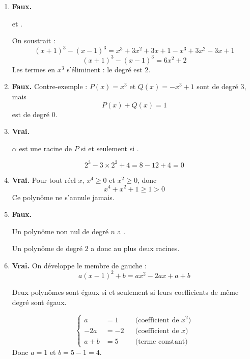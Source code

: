 \begin{enumerate}[itemsep=14pt]
  \item \textbf{Faux.}
  \begin{prop}
   \quad et \quad {}.
  \end{prop}
  On soustrait :
  \[(x+1)^3-(x-1)^3=x^3+3x^2+3x+1-x^3+3x^2-3x+1\]
  \[(x+1)^3-(x-1)^3=6x^2+2\]
  Les termes en $x^3$ s'éliminent : le degré est $2$.

  \item \textbf{Faux.} Contre-exemple : $P(x)=x^3$ et $Q(x)=-x^3+1$ sont de degré $3$, mais
  \[P(x)+Q(x)=1\]
  est de degré $0$.

  \item \textbf{Vrai.}
  \begin{prop}[Racine]
  $\alpha$ est une racine de $P$ si et seulement si .
  \end{prop}
  \[2^3-3\times2^2+4=8-12+4=0\]

  \item \textbf{Vrai.} Pour tout réel $x$, $x^4\geq0$ et $x^2\geq0$, donc
  \[x^4+x^2+1\geq1>0\]
  Ce polynôme ne s'annule jamais.

  \item \textbf{Faux.}
  \begin{prop}
  Un polynôme non nul de degré $n$ a .
  \end{prop}
  Un polynôme de degré $2$ a donc au plus deux racines.

  \item \textbf{Vrai.} On développe le membre de gauche :
  \[a(x-1)^2+b=ax^2-2ax+a+b\]
  \begin{prop}[Identification]
  Deux polynômes sont égaux si et seulement si leurs coefficients de même degré sont égaux.
  \end{prop}
  \[
  \left\{
  \begin{aligned}
    a&=1 &&\text{(coefficient de }x^2\text{)}\\
    -2a&=-2 &&\text{(coefficient de }x\text{)}\\
    a+b&=5 &&\text{(terme constant)}
  \end{aligned}
  \right.
  \]
  Donc $a=1$ et $b=5-1=4$.
\end{enumerate}
